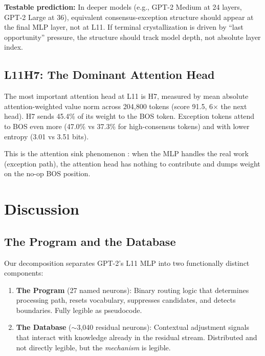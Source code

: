 \documentclass{article}
\begin{document}
\textbf{Testable prediction:} In deeper models (e.g., GPT-2 Medium at 24
layers, GPT-2 Large at 36), equivalent consensus-exception structure should
appear at the final MLP layer, not at L11.
If terminal crystallization is driven by ``last opportunity'' pressure, the
structure should track model depth, not absolute layer index.

\subsection{L11H7: The Dominant Attention Head}

The most important attention head at L11 is H7, measured by mean absolute
attention-weighted value norm across 204,800 tokens
(score 91.5, 6$\times$ the next head).
H7 sends 45.4\% of its weight to the BOS token.
Exception tokens attend to BOS even more (47.0\% vs 37.3\% for high-consensus
tokens) and with lower entropy (3.01 vs 3.51 bits).

This is the attention sink phenomenon \citep{xiao2023efficient}:
when the MLP handles the real work (exception path), the attention head has
nothing to contribute and dumps weight on the no-op BOS position.

\section{Discussion}

\subsection{The Program and the Database}

Our decomposition separates GPT-2's L11 MLP into two functionally distinct
components:

\begin{enumerate}
\item \textbf{The Program} (27 named neurons): Binary routing logic that
determines processing path, resets vocabulary, suppresses candidates, and detects
boundaries. Fully legible as pseudocode.

\item \textbf{The Database} ($\sim$3{,}040 residual neurons): Contextual adjustment
signals that interact with knowledge already in the residual stream. Distributed
and not directly legible, but the \emph{mechanism} is legible.
\end{enumerate}
\end{document}
